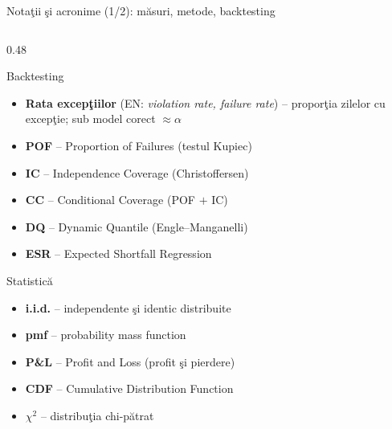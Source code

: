 \documentclass[9pt, aspectratio=169, t]{beamer}
\theoremstyle{definition}
\newenvironment{cminipage}[1]{%
    \par\noindent\hfill\begin{minipage}{#1}\ignorespaces
}{%
    \end{minipage}\hfill\null\par
}
\begin{document}
\begin{frame}[shrink=18]{Nota\c tii \c si acronime (1/2): m\u asuri, metode, backtesting}
\begin{cminipage}{0.96\textwidth}
\begin{columns}[T]
\begin{column}{0.48\textwidth}
\begin{block}{Backtesting}
\begin{itemize}
    \item \textbf{Rata excep\c tiilor} (EN: \textit{violation rate, failure rate}) -- propor\c tia zilelor cu excep\c tie; sub model corect $\approx \alpha$
    \item \textbf{POF} -- Proportion of Failures (testul Kupiec)
    \item \textbf{IC} -- Independence Coverage (Christoffersen)
    \item \textbf{CC} -- Conditional Coverage (POF $+$ IC)
    \item \textbf{DQ} -- Dynamic Quantile (Engle--Manganelli)
    \item \textbf{ESR} -- Expected Shortfall Regression
\end{itemize}
\end{block}
\begin{block}{Statistic\u a}
\begin{itemize}\setlength{\itemsep}{0pt}
    \item \textbf{i.i.d.} -- independente \c si identic distribuite
    \item \textbf{pmf} -- probability mass function
    \item \textbf{P\&L} -- Profit and Loss (profit \c si pierdere)
    \item \textbf{CDF} -- Cumulative Distribution Function
    \item \textbf{$\chi^2$} -- distribu\c tia chi-p\u atrat
\end{itemize}
\end{block}
\end{column}
\end{columns}
\end{cminipage}
\end{frame}
\end{document}
